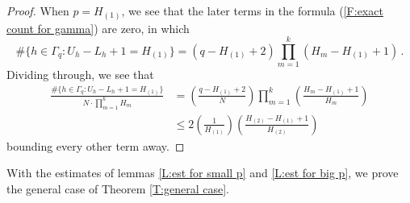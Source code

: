 \documentclass[11pt, oneside]{amsart}   	%
\newcommand{\1}{\mathbbm{1}}
\theoremstyle{definition}
\begin{document}
\begin{proof}
When $p = H_{(1)}$, we see that the later terms in the formula (\ref{F:exact count for gamma}) are zero, in which
$$\#\{h\in \Gamma_q : U_h - L_h +1 = H_{(1)}\} = (q - H_{(1)} + 2)\prod_{m=1}^k (H_m - H_{(1)} + 1)\, .$$
Dividing through, we see that
\begin{align*}
\frac{\#\{h\in \Gamma_q : U_h - L_h +1 = H_{(1)}\}}{N \cdot \prod_{m=1}^k H_m} &= \left( \frac{q - H_{(1)} + 2}{N}\right) \prod_{m=1}^k  \left(\frac{H_m - H_{(1)} + 1}{H_m}\right) \\
&\leq 2 \left( \frac{1}{H_{(1)}} \right) \left( \frac{H_{(2)} - H_{(1)} + 1}{H_{(2)}}\right)
\end{align*}
bounding every other term away.
\end{proof}

With the estimates of lemmas \ref{L:est for small p} and \ref{L:est for big p}, we prove the general case of Theorem \ref{T:general case}.
\end{document}
